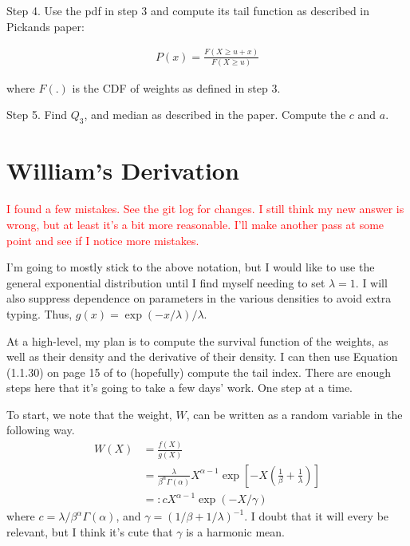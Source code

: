 \documentclass{article}
\begin{document}
Step 4. Use the pdf in step 3 and compute its tail function as described in Pickands paper:

\begin{align}
    P(x) = \frac{F(X \geq u+x)}{F(X \geq u)}
\end{align}

where $F(.)$ is the CDF of weights as defined in step 3.

Step 5. Find $Q_3$, and median as described in the paper. Compute the $c$ and $a$. 


\section{William's Derivation}

\textcolor{red}{I found a few mistakes. See the git log for changes. I still think my new answer is wrong, but at least it's a bit more reasonable. I'll make another pass at some point and see if I notice more mistakes.}

I'm going to mostly stick to the above notation, but I would like to use the general exponential distribution until I find myself needing to set $\lambda=1$. I will also suppress dependence on parameters in the various densities to avoid extra typing. Thus, $g(x) = \exp(-x/\lambda)/\lambda$.

At a high-level, my plan is to compute the survival function of the weights, as well as their density and the derivative of their density. I can then use Equation (1.1.30) on page 15 of \citet{deH06} to (hopefully) compute the tail index. There are enough steps here that it's going to take a few days' work. One step at a time.

To start, we note that the weight, $W$, can be written as a random variable in the following way.
%
\begin{align}
    W(X) &= \frac{f(X)}{g(X)}\\
    &= \frac{\lambda}{\beta^\alpha \Gamma(\alpha)} X^{\alpha - 1} \exp\left[ -X \left( \frac{1}{\beta} + \frac{1}{\lambda} \right) \right] \label{eq:def_W_wrong}\\
    &=: c X^{\alpha - 1} \exp(-X / \gamma)
\end{align}
%
where $c = \lambda / \beta^\alpha \Gamma(\alpha)$, and $\gamma = (1/\beta + 1/\lambda)^{-1}$. I doubt that it will every be relevant, but I think it's cute that $\gamma$ is a harmonic mean. 
\end{document}
